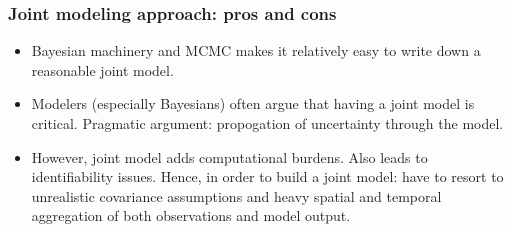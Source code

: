 \documentclass{beamer}
\begin{document}
\begin{frame}
  \frametitle{Joint modeling approach: pros and cons}
    \begin{itemize}
    \item Bayesian machinery and MCMC makes it relatively easy to
      write down a reasonable joint model.
    \item Modelers (especially Bayesians) often argue that having a
      joint model is critical. Pragmatic argument: propogation of
      uncertainty through the model. %
    \item However, joint model adds computational burdens. Also leads
      to identifiability issues.  Hence, in order to build a joint
      model: have to resort to unrealistic covariance assumptions and
      heavy spatial and temporal aggregation of both observations and
      model output.
    \end{itemize}
\end{frame}
\end{document}
